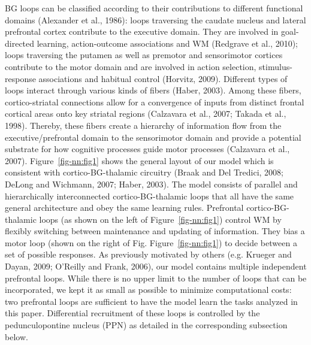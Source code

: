\documentclass[
  11pt,
  a4paper,
]{scrbook}
\begin{document}
BG loops can be classified according to their contributions to different
functional domains (Alexander et al., 1986): loops traversing the
caudate nucleus and lateral prefrontal cortex contribute to the
executive domain. They are involved in goal-directed learning,
action-outcome associations and WM (Redgrave et al., 2010); loops
traversing the putamen as well as premotor and sensorimotor cortices
contribute to the motor domain and are involved in action selection,
stimulus-response associations and habitual control (Horvitz, 2009).
Different types of loops interact through various kinds of fibers
(Haber, 2003). Among these fibers, cortico-striatal connections allow
for a convergence of inputs from distinct frontal cortical areas onto
key striatal regions (Calzavara et al., 2007; Takada et al., 1998).
Thereby, these fibers create a hierarchy of information flow from the
executive/prefrontal domain to the sensorimotor domain and provide a
potential substrate for how cognitive processes guide motor processes
(Calzavara et al., 2007). Figure~\ref{fig-nn:fig1} shows the general
layout of our model which is consistent with cortico-BG-thalamic
circuitry (Braak and Del Tredici, 2008; DeLong and Wichmann, 2007;
Haber, 2003). The model consists of parallel and hierarchically
interconnected cortico-BG-thalamic loops that all have the same general
architecture and obey the same learning rules. Prefrontal
cortico-BG-thalamic loops (as shown on the left of
Figure~\ref{fig-nn:fig1}) control WM by flexibly switching between
maintenance and updating of information. They bias a motor loop (shown
on the right of Fig. Figure~\ref{fig-nn:fig1}) to decide between a set
of possible responses. As previously motivated by others (e.g. Krueger
and Dayan, 2009; O'Reilly and Frank, 2006), our model contains multiple
independent prefrontal loops. While there is no upper limit to the
number of loops that can be incorporated, we kept it as small as
possible to minimize computational costs: two prefrontal loops are
sufficient to have the model learn the tasks analyzed in this paper.
Differential recruitment of these loops is controlled by the
pedunculopontine nucleus (PPN) as detailed in the corresponding
subsection below.
\end{document}
